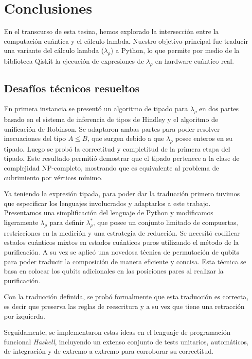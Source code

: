\chapter{Conclusiones}\label{ch:conclusiones}
En el transcurso de esta tesina, hemos explorado la intersección entre la computación cuántica y el cálculo lambda. Nuestro objetivo principal fue traducir una variante del cálculo lambda ($\lambda_\rho$) a Python, lo que permite por medio de la biblioteca Qiskit la ejecución de expresiones de $\lambda_\rho$ en hardware cuántico real.

\section{Desafíos técnicos resueltos}
En primera instancia se presentó un algoritmo de tipado para $\lambda_\rho$ en dos partes basado en el sistema de inferencia de tipos de Hindley y el algoritmo de unificación de Robinson. Se adaptaron ambas partes para poder resolver inecuaciones del tipo  $A\leq B$, que surgen debido a que $\lambda_\rho$ posee enteros en su tipado. Luego se probó la correctitud y completitud de la primera etapa del tipado. Este resultado permitió demostrar que el tipado pertenece a la clase de complejidad NP-completo, mostrando que es equivalente al problema de cubrimiento por vértices mínimo.

Ya teniendo la expresión tipada, para poder dar la traducción primero tuvimos que especificar los lenguajes involucrados y adaptarlos a este trabajo. Presentamos una simplificación del lenguaje de Python y modificamos ligeramente $\lambda_\rho$ para definir  $\lambda_\rho^*$, que posee un conjunto limitado de compuertas, restricciones en la medición y una estrategia de reducción. Se necesitó codificar estados cuánticos mixtos en estados cuánticos puros utilizando el método de la purificación. A su vez se aplicó una novedosa técnica de permutación de qubits para poder traducir la composición de manera eficiente y concisa. Esta técnica se basa en colocar los qubits adicionales en las posiciones pares al realizar la purificación.

Con la traducción definida, se probó formalmente que esta traducción es correcta, es decir que preserva las reglas de reescritura y a su vez que tiene una retracción por izquierda.


Seguidamente, se implementaron estas ideas en el lenguaje de programación funcional \textit{Haskell}, incluyendo un extenso conjunto de tests unitarios, automáticos, de integración y de extremo a extremo para corroborar su correctitud. 

